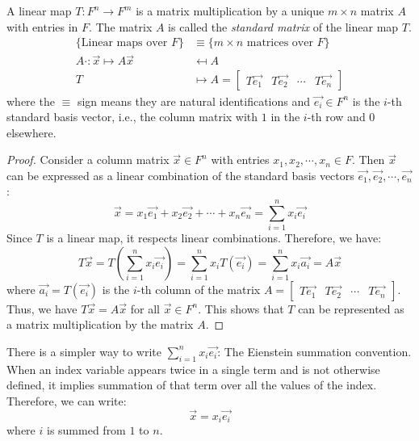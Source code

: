 \documentclass[11pt,fleqn]{book} %
\begin{document}
\begin{proposition}
    A linear map $T: F^n \to F^m$ is a matrix multiplication by a unique $m \times n$ matrix $A$ with entries in $F$. The matrix $A$ is called the \emph{standard matrix} of the linear map $T$.
    \[
        \begin{split}
            \{ \text{Linear maps over } F \} &\equiv \{ m \times n \text{ matrices over } F \} \\
            A\cdot : \vec{x} \mapsto A\vec{x} &\mapsfrom A \\
            T &\mapsto A = \begin{bmatrix}
                T\vec{e_1} & T\vec{e_2} & \cdots & T\vec{e_n}
            \end{bmatrix}
        \end{split}
    \]
    where the $\equiv$ sign means they are natural identifications and $\vec{e_i} \in F^n$ is the $i$-th standard basis vector, i.e., the column matrix with $1$ in the $i$-th row and $0$ elsewhere.
\end{proposition}

\begin{proof}
    Consider a column matrix $\vec{x} \in F^n$ with entries $x_1, x_2, \cdots, x_n \in F$. Then $\vec{x}$ can be expressed as a linear combination of the standard basis vectors $\vec{e_1}, \vec{e_2}, \cdots, \vec{e_n}$:
    \[
        \vec{x} = x_1 \vec{e_1} + x_2 \vec{e_2} + \cdots + x_n \vec{e_n} = \sum_{i=1}^{n} x_i \vec{e_i}
    \]
    Since $T$ is a linear map, it respects linear combinations. Therefore, we have:
    \[
        T\vec{x} = T\left( \sum_{i=1}^{n} x_i \vec{e_i} \right) = \sum_{i=1}^{n} x_i T(\vec{e_i}) = \sum_{i=1}^{n} x_i \vec{a_i} = A\vec{x}
    \]
    where $\vec{a_i} = T(\vec{e_i})$ is the $i$-th column of the matrix $A = \begin{bmatrix}
        T\vec{e_1} & T\vec{e_2} & \cdots & T\vec{e_n}
    \end{bmatrix}$. Thus, we have $T\vec{x} = A\vec{x}$ for all $\vec{x} \in F^n$. This shows that $T$ can be represented as a matrix multiplication by the matrix $A$.
\end{proof}

\begin{remark}
    There is a simpler way to write $\sum_{i=1}^{n} x_i \vec{e_i}$: The Eienstein summation convention. When an index variable appears twice in a single term and is not otherwise defined, it implies summation of that term over all the values of the index. Therefore, we can write:
    \[
        \vec{x} = x_i \vec{e_i}
    \]
    where $i$ is summed from $1$ to $n$.
\end{remark}
\end{document}
